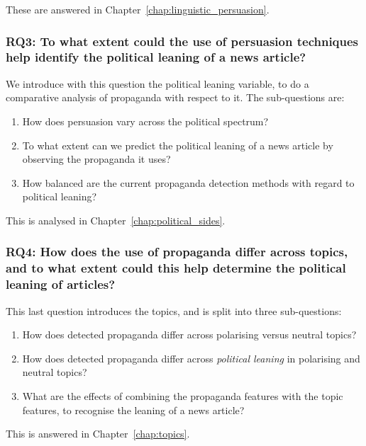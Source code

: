 These are answered in Chapter~\ref{chap:linguistic_persuasion}.

\subsubsection*{RQ3: To what extent could the use of persuasion techniques help identify the political leaning of a news article?}

We introduce with this question the political leaning variable, to do a comparative analysis of propaganda with respect to it. The sub-questions are:

\begin{enumerate}[label={\textbf{RQ3.\arabic*:}},leftmargin=2cm]
    \item How does persuasion vary across the political spectrum?
    \item To what extent can we predict the political leaning of a news article by observing the propaganda it uses?
    \item How balanced are the current propaganda detection methods with regard to political leaning?
\end{enumerate}

This is analysed in Chapter~\ref{chap:political_sides}.

\subsubsection*{RQ4: How does the use of propaganda differ across topics, and to what extent could this help determine the political leaning of articles?}

This last question introduces the topics, and is split into three sub-questions:

\begin{enumerate}[label={\textbf{RQ4.\arabic*:}},leftmargin=2cm]
    \item How does detected propaganda differ across polarising versus neutral topics?
    \item How does detected propaganda differ across \emph{political leaning} in polarising and neutral topics?
    \item What are the effects of combining the propaganda features with the topic features, to recognise the leaning of a news article?
\end{enumerate}

This is answered in Chapter~\ref{chap:topics}.


